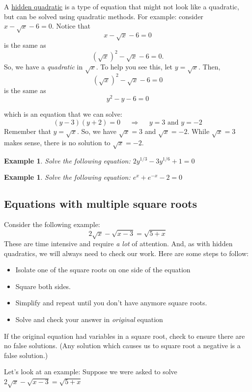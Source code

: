 \documentclass[twoside]{tufte-handout}
\newcounter{ekcounter}%
\theoremstyle{ekimcustom}
\newtheorem{exm}[ekcounter]{Example}
\begin{document}
 A \underline{hidden quadratic} is a type of equation that might not look like a quadratic, but can be solved using quadratic methods.  For example:  consider $x-\sqrt{x}-6=0$.  Notice that
$$x-\sqrt{x}-6=0$$ is the same as $$(\sqrt{x})^2-\sqrt{x}-6=0.$$   		
 So, we have a {\it quadratic} in $\sqrt{x}$.   To help you see this, let $y=\sqrt{x}$. Then,   
 $$(\sqrt{x})^2-\sqrt{x}-6=0$$ is the same as $$y^2-y-6=0$$

 which is an equation that we can solve:
$$(y-3)(y+2)=0  ~~~~~~\Rightarrow~~~~~~ y=3 \mbox{ and } y=-2$$
Remember that $y=\sqrt{x}$. So, we have $\sqrt{x}=3$ and $\sqrt{x}=-2$. While $\sqrt{x}=3$ makes sense, there is no solution to $\sqrt{x}=-2$.

\everymath{\displaystyle}
\begin{exm}{Solve the following equation: $2y^{1/3}-3y^{1/6}+1=0$}
\end{exm}\vskip10pt

\begin{exm}{Solve the following equation: $e^x+e^{-x}-2=0$}
\end{exm}\vskip10pt



\subsection{Equations with multiple square roots}

Consider the following example: $$2\sqrt{x}-\sqrt{x-3}=\sqrt{5+x}$$
These are time intensive and require {\it a lot} of attention. And, as with hidden quadratics, we will always need to check our work. Here are some steps to follow: 
		\begin{itemize}
	\item Isolate one of the square roots on one side of the equation  
	\item  Square both sides.
		\item Simplify and repeat until you don't have anymore square roots. 
			\item  Solve and check your answer in {\it original} equation 
\end{itemize}
\begin{bhabit}{}{}
If the original equation had variables in a square root, check to ensure there are no false solutions. (Any solution which causes us to square root a negative is a false solution.)
\end{bhabit}


Let's look at an example: Suppose we were asked to solve $2\sqrt{x}-\sqrt{x-3}=\sqrt{5+x}$
\end{document}
